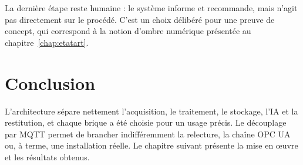 La dernière étape reste humaine : le système informe et recommande, mais n'agit pas directement sur le procédé. C'est un choix délibéré pour une preuve de concept, qui correspond à la notion d'ombre numérique présentée au chapitre~\ref{chap:etatart}.

\section{Conclusion}
L'architecture sépare nettement l'acquisition, le traitement, le stockage, l'IA et la restitution, et chaque brique a été choisie pour un usage précis. Le découplage par MQTT permet de brancher indifféremment la relecture, la chaîne OPC UA ou, à terme, une installation réelle. Le chapitre suivant présente la mise en œuvre et les résultats obtenus.
